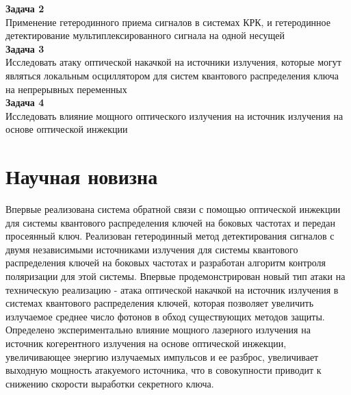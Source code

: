\textbf{Задача 2}\\
Применение гетеродинного приема сигналов в системах КРК, и гетеродинное детектирование мультиплексированного сигнала на одной несущей\\

\textbf{Задача 3}\\
Исследовать атаку оптической накачкой на источники излучения, которые могут являться локальным осциллятором для систем квантового распределения ключа на непрерывных переменных\\

\textbf{Задача 4}\\
Исследовать влияние мощного оптического излучения на источник излучения на основе оптической инжекции\\

\section*{Научная новизна}
Впервые реализована система обратной связи с помощью оптической инжекции для системы квантового распределения ключей на боковых частотах и передан просеянный ключ. Реализован гетеродинный метод детектирования сигналов с двумя независимыми источниками излучения для системы квантового распределения ключей на боковых частотах и разработан алгоритм контроля поляризации для этой системы. Впервые продемонстрирован новый тип атаки на техническую реализацию - атака оптической накачкой на источник излучения в системах квантового распределения ключей, которая позволяет увеличить излучаемое среднее число фотонов в обход существующих методов защиты. Определено экспериментально влияние мощного лазерного излучения на источник когерентного излучения на основе оптической инжекции, увеличивающее энергию излучаемых импульсов и ее разброс, увеличивает выходную мощность атакуемого источника, что в совокупности приводит к снижению скорости выработки секретного ключа.
